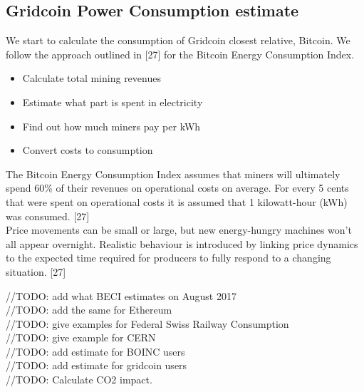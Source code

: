 \subsection{Gridcoin Power Consumption estimate}

We start to calculate the consumption of Gridcoin closest relative, Bitcoin. We follow the approach outlined in [27] for the Bitcoin Energy Consumption Index.

\begin{itemize}
	\item Calculate total mining revenues
	\item Estimate what part is spent in electricity
	\item Find out how much miners pay per kWh
	\item Convert costs to consumption
\end{itemize}

The Bitcoin Energy Consumption Index assumes that miners will ultimately spend 60\% of their revenues on operational costs on average. For every 5 cents that were spent on operational costs it is assumed that 1 kilowatt-hour (kWh) was consumed. [27]\\

Price movements can be small or large, but new energy-hungry machines won't all appear overnight. Realistic behaviour is introduced by linking price dynamics to the expected time required for producers to fully respond to a changing situation. [27]

//TODO: add what BECI estimates on August 2017\\
//TODO: add the same for Ethereum\\
//TODO: give examples for Federal Swiss Railway Consumption\\
//TODO: give example for CERN\\


//TODO: add estimate for BOINC users\\
//TODO: add estimate for gridcoin users\\

//TODO: Calculate CO2 impact. 